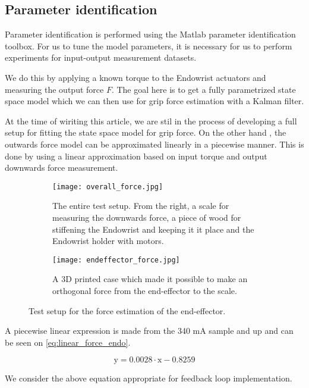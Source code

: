 


\subsection{Parameter identification}
Parameter identification is performed using the Matlab parameter identification toolbox.
For us to tune the model parameters, it is necessary for us to perform experiments for input-output measurement datasets.

We do this by applying a known torque to the Endowrist actuators and measuring the output force $F$.
The goal here is to get a fully parametrized state space model which we can then use for grip force estimation with a Kalman filter.

At the time of wiriting this article, we are stil in the process of developing a full setup for fitting the state space model for grip force.
On the other hand , the outwards force model can be approximated linearly in a piecewise manner.
This is done by using a linear approximation based on input torque and output downwards force measurement.

\begin{figure}
  \centering
  \begin{subfigure}{.45\linewidth}
    \centering
    \vspace{24pt}
    \texttt{[image: overall\_force.jpg]}
    \caption{The entire test setup. From the right, a scale for measuring the downwards force, a piece of wood for stiffening the Endowrist and keeping it it place and the Endowrist holder with motors.}
    \label{fig:entire_force_testsetup}
  \end{subfigure}
  \begin{subfigure}{.45\linewidth}
    \centering
    \texttt{[image: endeffector\_force.jpg]}
    \caption{A 3D printed case which made it possible to make an orthogonal force from the end-effector to the scale.}
    \label{fig:endeffector_force}
  \end{subfigure}
\caption{Test setup for the force estimation of the end-effector.}
\label{fig:Overview_force}
\end{figure}

A piecewise linear expression is made from the 340 mA sample and up and can be seen on \eqref{eq:linear_force_endo}.

\begin{equation}
\text{y} = 0.0028 \cdot \text{x} -0.8259 
\label{eq:linear_force_endo}
\end{equation} 

We consider the above equation appropriate for feedback loop implementation.